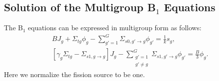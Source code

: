 \subsection{Solution of the Multigroup B$_1$ Equations}

The B$_1$ equations can be expressed in multigroup form as follows:
\begin{subequations}
\begin{align}
  &B J_g +  \Sigma_{tg} \phi_g - \sum_{g'=1}^G \Sigma_{s0,g' \rightarrow g} \phi_{g'} 
  = \frac{1}{k} s_g, \\
  &\left[ \gamma_g \Sigma_{tg} - \Sigma_{s1,g \rightarrow g} \right] J_g  - \sum_{\substack{g' = 1\\ g' \ne g}}^G \Sigma_{s1,g' \rightarrow g} \phi_{g'} = \frac{B}{3} \phi_g .
\end{align}
\end{subequations}
Here we normalize the fission source to be one.

